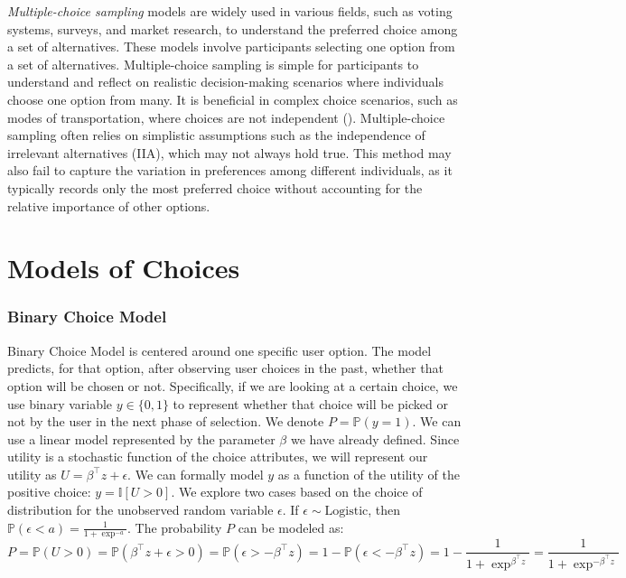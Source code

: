 \documentclass[
  letterpaper,
  numbers=noenddot,
  DIV=11]{scrreprt}
\theoremstyle{definition}
\theoremstyle{plain}
\theoremstyle{plain}
\theoremstyle{remark}
\begin{document}
\emph{Multiple-choice sampling} models are widely used in various
fields, such as voting systems, surveys, and market research, to
understand the preferred choice among a set of alternatives. These
models involve participants selecting one option from a set of
alternatives. Multiple-choice sampling is simple for participants to
understand and reflect on realistic decision-making scenarios where
individuals choose one option from many. It is beneficial in complex
choice scenarios, such as modes of transportation, where choices are not
independent ().
Multiple-choice sampling often relies on simplistic assumptions such as
the independence of irrelevant alternatives (IIA), which may not always
hold true. This method may also fail to capture the variation in
preferences among different individuals, as it typically records only
the most preferred choice without accounting for the relative importance
of other options.

\section{Models of Choices}\label{sec-models}

\subsubsection*{Binary Choice Model}\label{binary-choice-model}

Binary Choice Model is centered around one specific user option. The
model predicts, for that option, after observing user choices in the
past, whether that option will be chosen or not. Specifically, if we are
looking at a certain choice, we use binary variable \(y \in \{0, 1\}\)
to represent whether that choice will be picked or not by the user in
the next phase of selection. We denote \(P = \mathbb{P}(y = 1)\). We can
use a linear model represented by the parameter \(\beta\) we have
already defined. Since utility is a stochastic function of the choice
attributes, we will represent our utility as
\(U = \beta^\top z + \epsilon\). We can formally model \(y\) as a
function of the utility of the positive choice: \(y = \mathbb{I}[U>0]\).
We explore two cases based on the choice of distribution for the
unobserved random variable \(\epsilon\). If
\(\epsilon \sim \text{Logistic}\), then
\(\mathbb{P}(\epsilon < a) = \frac{1}{1 + \exp^{-a}}\). The probability
\(P\) can be modeled as: \[
P = \mathbb{P}(U > 0) = \mathbb{P}(\beta^\top z + \epsilon > 0) = \mathbb{P}( \epsilon > -\beta^\top z) = 1 - \mathbb{P}( \epsilon < -\beta^\top z) = 1 - \frac{1}{1 + \exp^{\beta^\top z}} = \frac{1}{1 + \exp^{-\beta^\top z}}
\]
\end{document}
